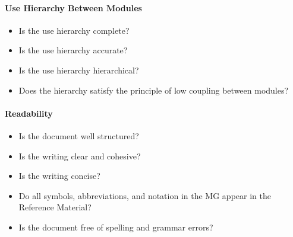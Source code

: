 \paragraph{Use Hierarchy Between Modules}
\begin{itemize}

    \item Is the use hierarchy complete?

    \item Is the use hierarchy accurate?

    \item Is the use hierarchy hierarchical?

    \item Does the hierarchy satisfy the principle of low coupling between
    modules?

\end{itemize}

\paragraph{Readability}
\begin{itemize}

    \item Is the document well structured?

    \item Is the writing clear and cohesive?

    \item Is the writing concise?

    \item Do all symbols, abbreviations, and notation in the MG appear in the
    Reference Material?

    \item Is the document free of spelling and grammar errors?

\end{itemize}